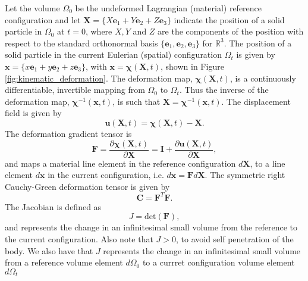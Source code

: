 Let the volume $\Omega_{0}$ be the undeformed Lagrangian (material) reference configuration and let $\boldsymbol{X}=\lbrace X\boldsymbol{e}_{1} +Y\boldsymbol{e}_{2} + Z\boldsymbol{e}_{3} \rbrace $ indicate the position of a solid particle in $\Omega_{0}$ at $t=0$, where $X,Y$ and $Z$ are the components of the position with respect to the standard orthonormal basis $\lbrace \boldsymbol{e}_{1}  ,\boldsymbol{e}_{2}  , \boldsymbol{e}_{3}  \rbrace $ for $\mathbb{R}^{3}$. The position of a solid particle in the current Eulerian (spatial) configuration $\Omega_{t}$ is given by $\boldsymbol{x}=\lbrace x\boldsymbol{e}_{1} +y\boldsymbol{e}_{2} + z\boldsymbol{e}_{3} \rbrace$, with  $\boldsymbol{x}=\boldsymbol\chi(\boldsymbol{X},t)$, shown in Figure \ref{fig:kinematic_deformation}. The deformation map, $\boldsymbol\chi(\boldsymbol{X},t)$, is a continuously
differentiable, invertible mapping from $\Omega_{0}$ to $\Omega_{t}$. Thus the inverse of the deformation map, $\boldsymbol\chi^{-1}(\boldsymbol{x},t)$, is such that $\boldsymbol{X}=\boldsymbol\chi^{-1}(\boldsymbol{x},t)$. The displacement field is given by
\begin{equation}
 \boldsymbol{u}(\boldsymbol{X},t)=\boldsymbol\chi(\boldsymbol{X},t)-\boldsymbol{X}.
 \label{eqn:displacement}
\end{equation}
The deformation gradient tensor is
\begin{equation}
 \boldsymbol{F}=\frac{\partial \boldsymbol\chi(\boldsymbol{X},t)}{\partial \boldsymbol{X}}=\boldsymbol{I}+\frac{\partial \boldsymbol{u}(\boldsymbol{X},t)}{\partial \boldsymbol{X}} ,
 \label{eqn:deformation_gradient}
\end{equation}
and maps a material line element in the reference configuration ${d}\boldsymbol{X}$, to a line element ${d}\boldsymbol{x}$ in the current configuration, i.e. ${d}\boldsymbol{x}=\boldsymbol{F}{d}\boldsymbol{X}$. The symmetric right Cauchy-Green deformation tensor is given by
\begin{equation}
\boldsymbol{C}={\boldsymbol{F}}^{T}{\boldsymbol{F}}.
\label{eqn:right_cg_tensor}
\end{equation}
The Jacobian is defined as
\begin{equation}
 J=\mbox{det}(\boldsymbol{F}),
 \label{eqn:jacobian}
\end{equation}
and represents the change in an infinitesimal small volume from the reference to the current configuration. Also note that $J > 0$, to avoid self penetration of the body. We also have that $J$ represents the change in an infinitesimal small volume from a reference volume element $d \Omega_{0}$ to a currret configuration  volume element $d \Omega_{t}$
